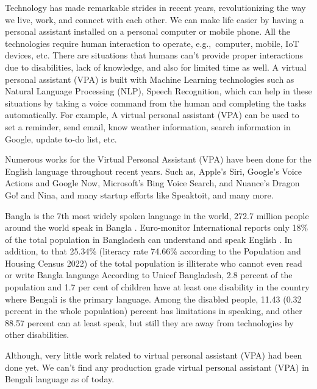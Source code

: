 Technology has made remarkable strides in recent years, revolutionizing the way we live, work, and connect with each other.
We can make life easier by having a personal assistant installed on a personal computer or mobile phone.
All the technologies require human interaction to operate, e.g.,\ computer, mobile, IoT devices, etc.
There are situations that humans can't provide proper interactions due to disabilities, lack of knowledge, and also for limited time as well.
A virtual personal assistant (VPA) is built with Machine Learning technologies such as Natural Language Processing (NLP), Speech Recognition, which can help in these situations by taking a voice command from the human and completing the tasks automatically.
For example, A virtual personal assistant (VPA) can be used to set a reminder, send email, know weather information, search information in Google, update to-do list, etc\cite{adheetee}.

Numerous works for the Virtual Personal Assistant (VPA) have been done for the English language throughout recent years.
Such as, Apple’s Siri\cite{siri}, Google’s Voice Actions\cite{google-mobile} and Google Now\cite{google-now}, Microsoft’s Bing Voice Search\cite{microsoft-tellme}, and Nuance’s Dragon Go! \cite{nuance-dragon} and Nina\cite{nuance-nina}, and many startup efforts like Speaktoit\cite{speaktoit}, and many more.

Bangla is the 7th most widely spoken language in the world, 272.7 million people around the world speak in Bangla \cite{mostspoken}.
Euro-monitor International reports only 18\% of the total population in Bangladesh can understand and speak English \cite{english-speaker-bangladesh}.
In addition, to that 25.34\% (literacy rate 74.66\% according to the Population and Housing Census 2022) of the total population is illiterate who cannot even read or write Bangla language \cite{litaracy-bangladesh}
According to Unicef Bangladesh, 2.8 percent of the population and 1.7 per cent of children have at least one disability \cite{disabled-stats} in the country where Bengali is the primary language.
Among the disabled people, 11.43 (0.32 percent in the whole population) percent has limitations in speaking, and other 88.57 percent can at least speak, but still they are away from technologies by other disabilities.

Although, very little work related to virtual personal assistant (VPA) had been done yet\cite{adheetee}.
We can't find any production grade virtual personal assistant (VPA) in Bengali language as of today.

